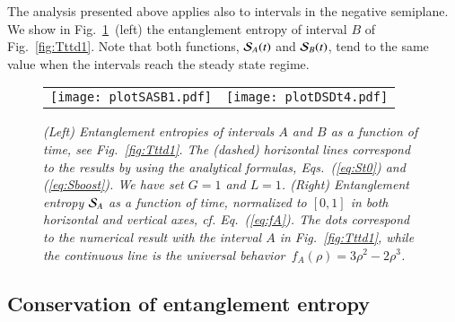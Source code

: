 \documentclass[epj]{webofc}
\begin{document}
The analysis presented above applies also to intervals in the negative semiplane. We show in Fig.~\ref{fig:Suniversal}~(left) the entanglement entropy of interval $B$ of Fig.~\ref{fig:Tttd1}.  Note that both functions, ${\cal S}_A(t)$ and ${\cal S}_B(t)$, tend to the same value when the intervals reach the steady state regime.


\begin{figure*}[htb]
\begin{tabular}{cc}
\texttt{[image: plotSASB1.pdf]} & 
\texttt{[image: plotDSDt4.pdf]}
\end{tabular}
\caption{\it (Left) Entanglement entropies of intervals $A$ and $B$ as a function of time, see Fig.~\ref{fig:Tttd1}. The (dashed) horizontal lines correspond to the results by using the analytical formulas, Eqs.~(\ref{eq:St0}) and (\ref{eq:Sboost}). We have set $G=1$ and $L=1$. (Right) Entanglement entropy ${\cal S}_A$ as a function of time, normalized to $[0,1]$ in both horizontal and vertical axes, cf. Eq.~(\ref{eq:fA}). The dots correspond to the numerical result with the interval $A$ in Fig.~\ref{fig:Tttd1}, while the continuous line is the universal behavior~$f_A(\rho) = 3\rho^2 - 2\rho^3$. }
\label{fig:Suniversal}
\end{figure*}





\subsection{Conservation of entanglement entropy}
\label{sec:conservation_entanglement_entropy}
\end{document}
